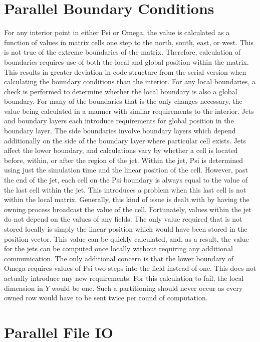 \documentclass[twocolumn]{article}
\begin{document}
\section{Parallel Boundary Conditions}
For any interior point in either Psi or Omega, the value is calculated
as a function of values in matrix cells one step to the north, south, east, or
west. This is not true of the extreme boundaries of the matrix. Therefore,
calculation of boundaries requires use of both the local and global position
within the matrix. This results in greater deviation in code structure from
the serial version when calculating the boundary conditions than the interior.
For any local boundaries, a check is performed to determine whether the
local boundary is also a global boundary. For many of the boundaries
that is the only changes necessary, the value being calculated in a manner
with similar requirements to the interior. Jets and boundary layers each
introduce requirements for global position in the boundary layer.
The side boundaries involve boundary layers which depend additionally
on the side of the boundary layer where particular cell exists. Jets affect
the lower boundary, and calculations vary by whether a cell is located
before, within, or after the region of the jet. Within the jet, Psi
is determined using just the simulation time and the linear position
of the cell. However, past the end of the jet, each cell on the Psi
boundary is always equal to the value of the last cell within the jet.
This introduces a problem when this last cell is not within the local
matrix. Generally, this kind of issue is dealt with by having the
owning process broadcast the value of the cell. Fortunately, values
within the jet do not depend on the values of any fields. The only
value required that is not stored locally is simply the linear position
which would have been stored in the position vector. This value can
be quickly calculated, and, as a result, the value for the jets can be
computed once locally without requiring any additional communication.
The only additional concern is that the lower boundary of Omega requires
values of Psi two steps into the field instead of one. This does not
actually introduce any new requirements. For this calculation to fail,
the local dimension in $Y$ would be one. Such a partitioning should
never occur as every owned row would have to be sent twice per round
of computation.

\section{Parallel File IO}
\end{document}
